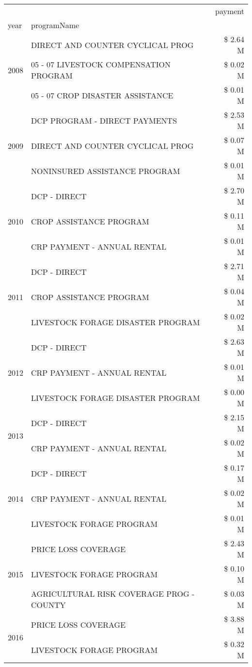 \begin{tabular}{llr}
\toprule
 &  & payment \\
year & programName &  \\
\midrule
\multirow[t]{3}{*}{2008} & DIRECT AND COUNTER CYCLICAL PROG & \$ 2.64 M \\
 & 05 - 07 LIVESTOCK COMPENSATION PROGRAM & \$ 0.02 M \\
 & 05 - 07 CROP DISASTER ASSISTANCE & \$ 0.01 M \\
\cline{1-3}
\multirow[t]{3}{*}{2009} & DCP PROGRAM - DIRECT PAYMENTS & \$ 2.53 M \\
 & DIRECT AND COUNTER CYCLICAL PROG & \$ 0.07 M \\
 & NONINSURED ASSISTANCE PROGRAM & \$ 0.01 M \\
\cline{1-3}
\multirow[t]{3}{*}{2010} & DCP - DIRECT & \$ 2.70 M \\
 & CROP ASSISTANCE PROGRAM & \$ 0.11 M \\
 & CRP PAYMENT - ANNUAL RENTAL & \$ 0.01 M \\
\cline{1-3}
\multirow[t]{3}{*}{2011} & DCP - DIRECT & \$ 2.71 M \\
 & CROP ASSISTANCE PROGRAM & \$ 0.04 M \\
 & LIVESTOCK FORAGE DISASTER PROGRAM & \$ 0.02 M \\
\cline{1-3}
\multirow[t]{3}{*}{2012} & DCP - DIRECT & \$ 2.63 M \\
 & CRP PAYMENT - ANNUAL RENTAL & \$ 0.01 M \\
 & LIVESTOCK FORAGE DISASTER PROGRAM & \$ 0.00 M \\
\cline{1-3}
\multirow[t]{2}{*}{2013} & DCP - DIRECT & \$ 2.15 M \\
 & CRP PAYMENT - ANNUAL RENTAL & \$ 0.02 M \\
\cline{1-3}
\multirow[t]{3}{*}{2014} & DCP - DIRECT & \$ 0.17 M \\
 & CRP PAYMENT - ANNUAL RENTAL & \$ 0.02 M \\
 & LIVESTOCK FORAGE PROGRAM & \$ 0.01 M \\
\cline{1-3}
\multirow[t]{3}{*}{2015} & PRICE LOSS COVERAGE & \$ 2.43 M \\
 & LIVESTOCK FORAGE PROGRAM & \$ 0.10 M \\
 & AGRICULTURAL RISK COVERAGE PROG - COUNTY & \$ 0.03 M \\
\cline{1-3}
\multirow[t]{3}{*}{2016} & PRICE LOSS COVERAGE & \$ 3.88 M \\
 & LIVESTOCK FORAGE PROGRAM & \$ 0.32 M \\

\end{tabular}
